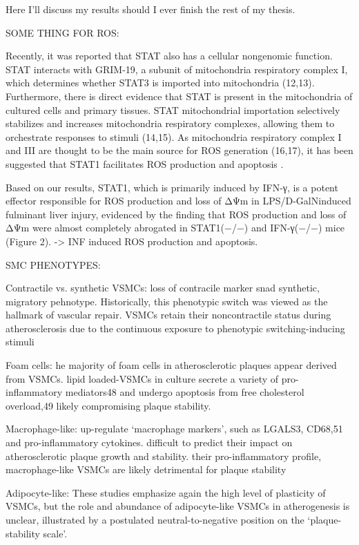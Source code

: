 Here I'll discuss my results should I ever finish the rest of my thesis.



SOME THING FOR ROS:


    Recently, it was reported that STAT also has a cellular
    nongenomic function. STAT interacts with GRIM-19, a
    subunit of mitochondria respiratory complex I, which determines whether STAT3 is imported into mitochondria (12,13).
    Furthermore, there is direct evidence that STAT is present in
    the mitochondria of cultured cells and primary tissues. STAT
    mitochondrial importation selectively stabilizes and increases
    mitochondria respiratory complexes, allowing them to orchestrate responses to stimuli (14,15). As mitochondria respiratory
    complex I and III are thought to be the main source for ROS
    generation (16,17), it has been suggested that STAT1 facilitates
    ROS production and apoptosis \cite{leeRoleSTAT1IRF12007}. \cite{wangSTATROSCycleExtends2018}

    Based on our results, STAT1, which is primarily induced by IFN-γ, is a potent effector responsible for ROS production and loss of ΔΨm in LPS/D-GalNinduced fulminant liver injury, evidenced by the finding that ROS production and loss of ΔΨm were almost completely abrogated in STAT1(−/−) and IFN-γ(−/−) mice (Figure 2). -> INF induced ROS production and apoptosis.


SMC PHENOTYPES:


Contractile vs. synthetic VSMCs: loss of contracile marker snad synthetic, migratory pehnotype. Historically, this phenotypic switch was viewed as the hallmark of vascular repair. VSMCs retain their noncontractile status during atherosclerosis due to the continuous exposure to phenotypic switching-inducing stimuli

Foam cells: he majority of foam cells in atherosclerotic plaques appear derived from VSMCs. lipid loaded-VSMCs in culture secrete a variety of pro-inflammatory mediators48 and undergo apoptosis from free cholesterol overload,49 likely compromising plaque stability.

Macrophage-like: up-regulate ‘macrophage markers’, such as LGALS3, CD68,51 and pro-inflammatory cytokines. difficult to predict their impact on atherosclerotic plaque growth and stability. their pro-inflammatory profile, macrophage-like VSMCs are likely detrimental for plaque stability

Adipocyte-like: These studies emphasize again the high level of plasticity of VSMCs, but the role and abundance of adipocyte-like VSMCs in atherogenesis is unclear, illustrated by a postulated neutral-to-negative position on the ‘plaque-stability scale’.

